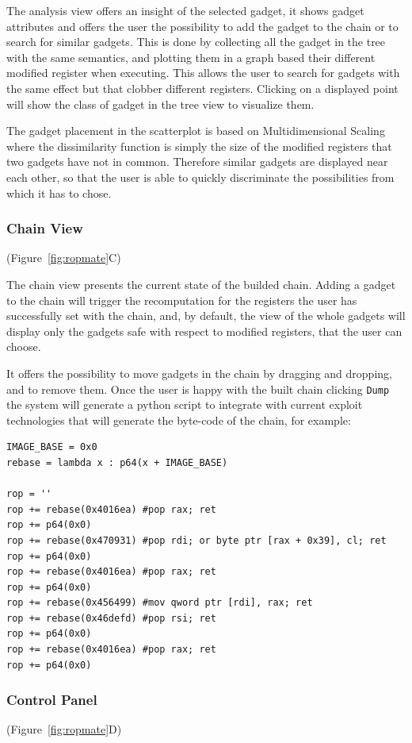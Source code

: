 \documentclass[twocolumn, 11pt]{article}
\begin{document}
The analysis view offers an insight of the selected gadget, it shows gadget attributes and offers the user the possibility to add the gadget to the chain or to search for similar gadgets. This is done by collecting all the gadget in the tree with the same semantics, and plotting them in a graph based their different modified register when executing. This allows the user to search for gadgets with the same effect but that clobber different registers. Clicking on a displayed point will show the class of gadget in the tree view to visualize them.

The gadget placement in the scatterplot is based on Multidimensional Scaling where the dissimilarity function is simply the size of the modified registers that two gadgets have not in common. Therefore similar gadgets are displayed near each other, so that the user is able to quickly discriminate the possibilities from which it has to chose.

\subsubsection{Chain View}
(Figure~\ref{fig:ropmate}C)

The chain view presents the current state of the builded chain. Adding a gadget to the chain will trigger the recomputation for the registers the user has successfully set with the chain, and, by default, the view of the whole gadgets will display only the gadgets safe with respect to modified registers, that the user can choose.

It offers the possibility to move gadgets in the chain by dragging and dropping, and to remove them. Once the user is happy with the built chain clicking {\tt Dump} the system will generate a python script to integrate with current exploit technologies that will generate the byte-code of the chain, for example:


\begin{lstlisting}
IMAGE_BASE = 0x0
rebase = lambda x : p64(x + IMAGE_BASE)

rop = ''
rop += rebase(0x4016ea) #pop rax; ret
rop += p64(0x0)
rop += rebase(0x470931) #pop rdi; or byte ptr [rax + 0x39], cl; ret
rop += p64(0x0)
rop += rebase(0x4016ea) #pop rax; ret
rop += p64(0x0)
rop += rebase(0x456499) #mov qword ptr [rdi], rax; ret
rop += rebase(0x46defd) #pop rsi; ret
rop += p64(0x0)
rop += rebase(0x4016ea) #pop rax; ret
rop += p64(0x0)
\end{lstlisting}

\subsubsection{Control Panel}
(Figure~\ref{fig:ropmate}D)
\end{document}
